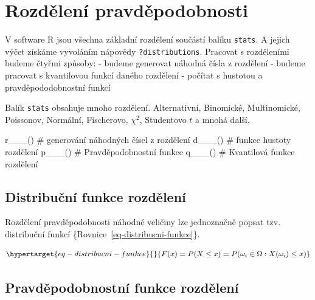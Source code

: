 \documentclass[
  letterpaper,
  DIV=11,
  numbers=noendperiod]{scrreprt}
\newenvironment{Shaded}{\begin{snugshade}}{\end{snugshade}}
\newcommand{\CommentTok}[1]{\textcolor[rgb]{0.37,0.37,0.37}{#1}}
\newcommand{\FunctionTok}[1]{\textcolor[rgb]{0.28,0.35,0.67}{#1}}
\newcommand{\NormalTok}[1]{\textcolor[rgb]{0.00,0.23,0.31}{#1}}
\begin{document}
\hypertarget{sec-rozdeleni}{%
\chapter{Rozdělení pravděpodobnosti}\label{sec-rozdeleni}}

V software R jsou všechna základní rozdělení součástí balíku
\texttt{stats}. A jejich výčet získáme vyvoláním nápovědy
\texttt{?distributions}. Pracovat s rozděleními budeme čtyřmi způsoby: -
budeme generovat náhodná čísla z rozdělení - budeme pracovat s
kvantilovou funkcí daného rozdělení - počítat s hustotou a
pravděpododobnostní funkcí

Balík \texttt{stats} obsahuje mnoho rozdělení. Alternativní, Binomické,
Multinomické, Poissonov, Normální, Fischerovo, \(\chi^2\), Studentovo
\(t\) a mnohá další.

\begin{Shaded}
\begin{Highlighting}[]
\FunctionTok{r\_\_\_}\NormalTok{() }\CommentTok{\# generování náhodných čísel z rozdělení}
\FunctionTok{d\_\_\_}\NormalTok{() }\CommentTok{\# funkce hustoty rozdělení}
\FunctionTok{p\_\_\_}\NormalTok{() }\CommentTok{\# Pravděpodobnostní funkce }
\FunctionTok{q\_\_\_}\NormalTok{() }\CommentTok{\# Kvantilová funkce rozdělení}
\end{Highlighting}
\end{Shaded}

\hypertarget{distribuux10dnuxed-funkce-rozdux11blenuxed}{%
\section{Distribuční funkce
rozdělení}\label{distribuux10dnuxed-funkce-rozdux11blenuxed}}

Rozdělení pravděpodobnosti náhodné veličiny lze jednoznačně popsat tzv.
distribuční funkcí \{Rovnice~\ref{eq-distribucni-funkce}\}.

\begin{equation}\protect\hypertarget{eq-distribucni-funkce}{}{
F(x) = P(X\leq x) = P(\omega_i\in\Omega : X(\omega_i)\leq x)
}\label{eq-distribucni-funkce}\end{equation}

\hypertarget{pravdux11bpodobnostnuxed-funkce-rozdux11blenuxed}{%
\section{Pravděpodobnostní funkce
rozdělení}\label{pravdux11bpodobnostnuxed-funkce-rozdux11blenuxed}}
\end{document}

